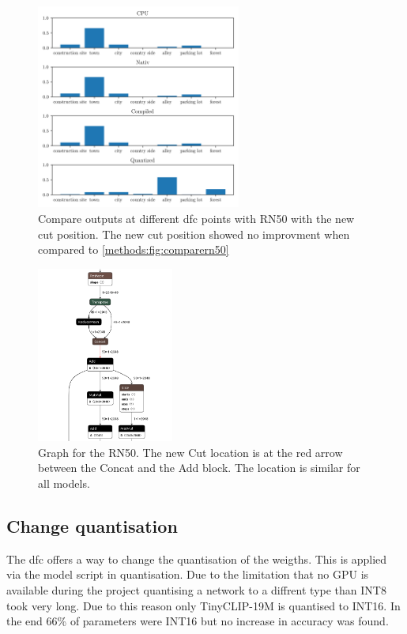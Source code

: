 \begin{figure}[]
    \centering
    \includegraphics[width=0.6\textwidth]{Images/Implementation/compareProbs_newCut_RN50.png}
    \caption{Compare outputs at different \acrshort{dfc} points with RN50 with the new cut position. The new cut position showed no improvment when compared to \cref{methods:fig:comparern50}}
    \label{methods:fig:comparern50newcut}
\end{figure}

\begin{figure}[]
    \centering
    \includegraphics[width=0.4\textwidth]{Images/Implementation/secondcutlocation.png}
    \caption{Graph for the RN50. The new Cut location is at the red arrow between the Concat and the Add block.
    The location is similar for all models.}
    \label{methods:fig:rn50newcut}
\end{figure}

\subsection{Change quantisation}

The \acrshort{dfc} offers a way to change the quantisation of the weigths.
This is applied via the model script in quantisation.
Due to the limitation that no GPU is available during the project quantising a network to a diffrent type than INT8 took very long.
Due to this reason only TinyCLIP-19M is quantised to INT16.
In the end 66\% of parameters were INT16 but no increase in accuracy was found.
